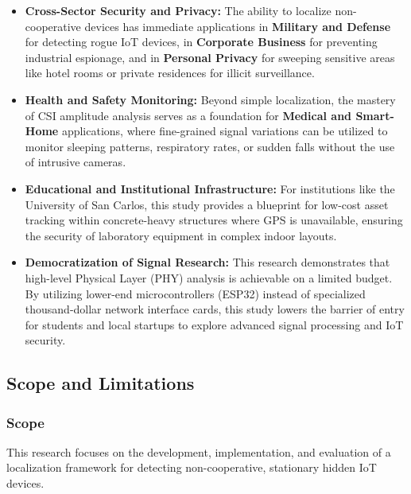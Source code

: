\begin{itemize}
    \item \textbf{Cross-Sector Security and Privacy:} The ability to localize non-cooperative devices has immediate applications in \textbf{Military and Defense} for detecting rogue IoT devices, in \textbf{Corporate Business} for preventing industrial espionage, and in \textbf{Personal Privacy} for sweeping sensitive areas like hotel rooms or private residences for illicit surveillance.

    \item \textbf{Health and Safety Monitoring:} Beyond simple localization, the mastery of CSI amplitude analysis serves as a foundation for \textbf{Medical and Smart-Home} applications, where fine-grained signal variations can be utilized to monitor sleeping patterns, respiratory rates, or sudden falls without the use of intrusive cameras.

    \item \textbf{Educational and Institutional Infrastructure:} For institutions like the University of San Carlos, this study provides a blueprint for low-cost asset tracking within concrete-heavy structures where GPS is unavailable, ensuring the security of laboratory equipment in complex indoor layouts.

    \item \textbf{Democratization of Signal Research:} This research demonstrates that high-level Physical Layer (PHY) analysis is achievable on a limited budget. By utilizing lower-end microcontrollers (ESP32) instead of specialized thousand-dollar network interface cards, this study lowers the barrier of entry for students and local startups to explore advanced signal processing and IoT security.
\end{itemize}


\subsection{Scope and Limitations}

\subsubsection{Scope}
This research focuses on the development, implementation, and evaluation of a localization framework for detecting non-cooperative, stationary hidden IoT devices.

